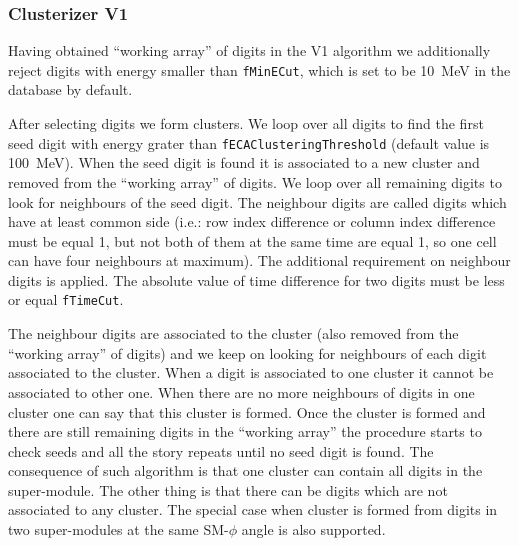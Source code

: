\subsubsection{Clusterizer V1}
Having obtained ``working array'' of digits in the V1 algorithm we additionally reject digits with energy smaller than \texttt{fMinECut}, which is set to be 10~MeV in the database by default.

After selecting digits we form clusters. We loop over all digits to find the first seed digit with energy grater than \texttt{fECAClusteringThreshold} (default value is 100~MeV). 
When the seed digit is found it is associated to a new cluster and removed from the ``working array'' of digits. We loop over all remaining digits to look for neighbours of the seed digit.
The neighbour digits are called digits which have at least common side (i.e.: row index difference or column index difference must be equal 1, but not both of them at the same time are equal 1, so one cell can have four neighbours at maximum).
The additional requirement on neighbour digits is applied. The absolute value of time difference for two digits must be less or equal \texttt{fTimeCut}.

The neighbour digits are associated to the cluster (also removed from the ``working array'' of digits) and we keep on looking for neighbours of each digit associated to the cluster. When a digit is associated to one cluster it cannot be associated to other one. When there are no more neighbours of digits in one cluster one can say that this cluster is formed. Once the cluster
is formed and there are still remaining digits in the ``working array'' the procedure starts to check seeds and all the story repeats until no seed digit is found. The consequence of such algorithm is that one cluster can contain all digits in the super-module. The other thing is that there can be digits which are not associated to any cluster. The special case when cluster is formed from digits in two super-modules at the same SM-$\phi$ angle is also supported.  



